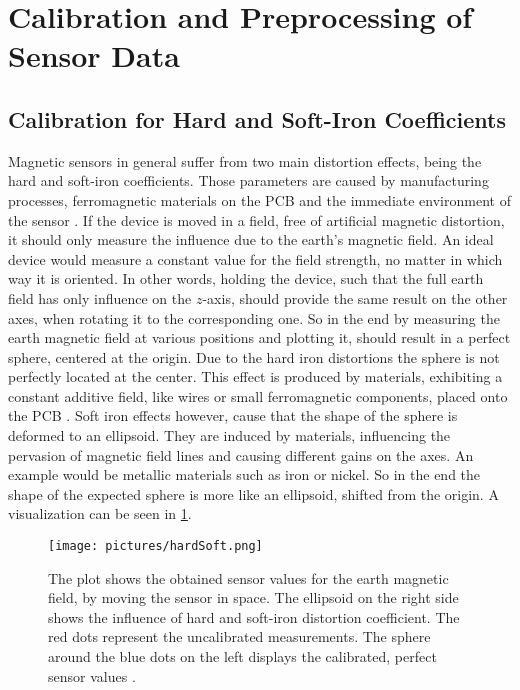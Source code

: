 \FloatBarrier

\section{Calibration and Preprocessing of Sensor Data} \label{sec:caliPrepro}

\subsection{Calibration for Hard and Soft-Iron Coefficients} \label{subsec:hardSoft}

Magnetic sensors in general suffer from two main distortion effects, being the hard and soft-iron coefficients. Those parameters are caused by manufacturing processes, ferromagnetic materials on the \ac{PCB} and the immediate environment of the sensor \cite{ozyagcilar2012calibrating}. If the device is moved in a field, free of artificial magnetic distortion, it should only measure the influence due to the earth's magnetic field. An ideal device would measure a constant value for the field strength, no matter in which way it is oriented. In other words, holding the device, such that the full earth field has only influence on the $ z $-axis, should provide the same result on the other axes, when rotating it to the corresponding one. So in the end by measuring the earth magnetic field at various positions and plotting it, should result in a perfect sphere, centered at the origin. Due to the hard iron distortions the sphere is not perfectly located at the center. This effect is produced by materials, exhibiting a constant additive field, like wires or small ferromagnetic components, placed onto the \ac{PCB} \cite{konv2009}. Soft iron effects however, cause that the shape of the sphere is deformed to an ellipsoid. They are induced by materials, influencing the pervasion of magnetic field lines and causing different gains on the axes. An example would be metallic materials such as iron or nickel. So in the end the shape of the expected sphere is more like an ellipsoid, shifted from the origin. A visualization can be seen in \ref{fig:hardSoft}.\\
\begin{figure}
\centering
\texttt{[image: pictures/hardSoft.png]}
\caption[Calibrated and uncalibrated sensor data]
{The plot shows the obtained sensor values for the earth magnetic field, by moving the sensor in space. The ellipsoid on the right side shows the influence of hard and soft-iron distortion coefficient. The red dots represent the uncalibrated measurements. The sphere around the blue dots on the left displays the calibrated, perfect sensor values \cite{ozyagcilar2012calibrating}.}
\label{fig:hardSoft}
\end{figure}
